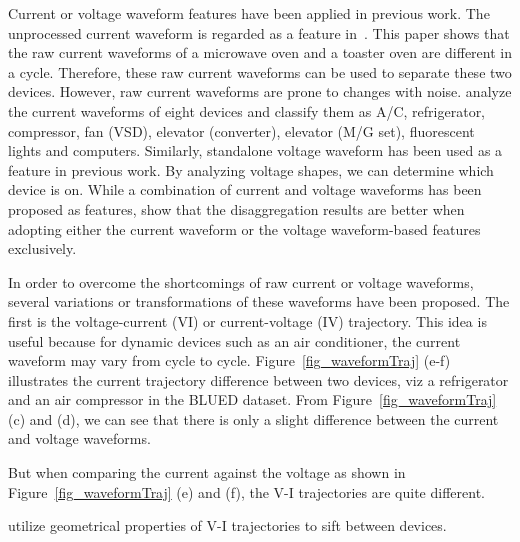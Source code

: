 Current or voltage waveform features have been applied in previous work.
The unprocessed current waveform 
is regarded as a feature in~\cite{suzuki2008nonintrusive}.
This paper shows that 
the raw current waveforms of a microwave oven and a toaster oven 
are different in a cycle. 
Therefore, these raw current waveforms can be used to separate 
these two devices. 
However, raw current waveforms are prone to changes with noise.
\cite{duan2004neural} analyze the current waveforms of eight devices and classify
them as A/C, refrigerator, compressor, 
fan (VSD), elevator (converter), elevator (M/G set), fluorescent lights 
and computers. 
Similarly, standalone voltage waveform has been used as a feature in previous work. 
By analyzing voltage shapes,
we can determine which device is on.
While a combination of current and voltage waveforms has been proposed as
features, \cite{hassan2014empirical} show that the disaggregation results 
are better
when adopting either the current waveform or the voltage waveform-based
features exclusively.

In order to overcome the shortcomings of raw current or voltage waveforms, 
several variations or transformations of these waveforms have been proposed. 
The first is the voltage-current (V\-I) or current-voltage (I\-V) trajectory. 
This idea is useful because for
dynamic devices such as an air conditioner,
the current waveform may vary from cycle to cycle.
Figure~\ref{fig_waveformTraj} (e-f) illustrates the current trajectory difference between 
two devices, %
viz a refrigerator and an air compressor in the BLUED dataset. 
From Figure~\ref{fig_waveformTraj} (c) and (d), 
we can see that there is only a slight difference between the current and voltage waveforms.
\iffalse
\manishc{not
  clear, do you mean in subfigures (c) and (d), there is a difference in the
  current and voltage waveforms?} \huijuanc{Yes. I mean little difference not much.}
\fi  
But when comparing the current against the voltage as shown in
Figure~\ref{fig_waveformTraj} (e) and (f), 
the V-I trajectories are quite different. 

\cite{lam2007novel} utilize 
geometrical properties of V-I trajectories to sift between devices. 
\iffalse
\manishc{some of the figure refs seem to be off, can you verify? also, in fig
  13, (c) should be (d), and can you label the two rows of plots with 'refrigerator' and 'air compressor' 
}\huijuanc{add the label.}
\fi

